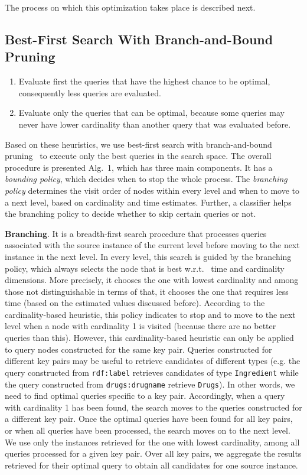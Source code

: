 The process on which this optimization takes place is described next.

\subsection{Best-First Search With Branch-and-Bound Pruning} 

\begin{enumerate}
  \item Evaluate first the queries that have the highest chance to be optimal, consequently less queries    are evaluated.
  \item Evaluate only the queries that can be optimal, because some queries may never have lower cardinality than another query that was evaluated before.
\end{enumerate} 

Based on these heuristics, we use best-first search with branch-and-bound pruning~\cite{DBLP:journals/jacm/DechterP85} to execute only the best queries in the search space. The overall procedure is presented Alg.~1, which has three main components. It has a \emph{bounding policy}, which decides when to stop the whole process. The \emph{branching policy} determines the visit order of nodes within every level and when to move to a next level, based on cardinality and time estimates. Further, a classifier helps the branching policy to decide whether to skip certain queries or not. 

\textbf{Branching}. It is a breadth-first search procedure that processes queries associated with the source instance of the current level before moving to the next instance in the next level. In every level, this search is guided by the branching policy, which always selects the node that is best w.r.t.~ time and cardinality dimensions. More precisely, it chooses the one with lowest cardinality and among those not distinguishable in terms of that, it chooses the one that requires less time (based on the estimated values discussed before). According to the cardinality-based heuristic, this policy indicates to stop and to move to the next level when a node with cardinality 1 is visited (because there are no better queries than this). However, this cardinality-based heuristic can only be applied to query nodes constructed for the same key pair. Queries constructed for different key pairs may be useful to retrieve candidates of different types (e.g. the query constructed from \verb+rdf:label+ retrieves candidates of type \verb+Ingredient+ while the query constructed from \verb+drugs:drugname+ retrieve \verb+Drugs+). In other words, we need to find optimal queries specific to a key pair. Accordingly, when a query with cardinality 1 has been found, the search moves to the queries constructed for a different key pair. 
Once the optimal queries have been found for all key pairs, or when all queries have been processed, the search moves on to the next level. We use only the instances retrieved for the one with lowest cardinality, among all queries processed for a given key pair. Over all key pairs, we aggregate the results retrieved for their optimal query to obtain all candidates for one source instance. 
 

